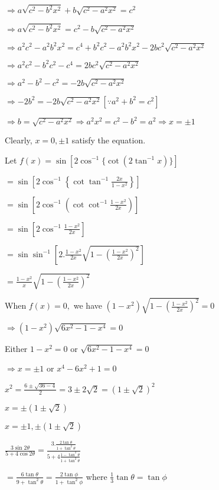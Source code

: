   $\Rightarrow a\sqrt{c^2 - b^2x^2} + b\sqrt{c^2 - a^2x^2} = c^2$

  $\Rightarrow a\sqrt{c^2 - b^2x^2} = c^2 - b\sqrt{c^2 - a^2x^2}$

  $\Rightarrow a^2c^2 - a^2b^2x^2 = c^4 + b^2c^2 - a^2b^2x^2 - 2bc^2\sqrt{c^2 - a^2x^2}$

  $\Rightarrow a^2c^2 - b^2c^2 - c^4 = 2bc^2\sqrt{c^2 - a^2x^2}$

  $\Rightarrow a^2 - b^2 - c^2 = -2b\sqrt{c^2 - a^2x^2}$

  $\Rightarrow -2b^2 = -2b\sqrt{c^2 - a^2x^2}[\because a^2 + b^2 = c^2]$

  $\Rightarrow b = \sqrt{c^2 - a^2x^2} \Rightarrow a^2x^2 = c^2 - b^2 = a^2 \Rightarrow x = \pm 1$

  Clearly, $x = 0, \pm 1$ satisfy the equation.

\item Let $f(x) = \sin[2\cos^{-1}\{\cot(2\tan^{-1}x)\}]$

  $= \sin\left[2\cos^{-1}\left\{\cot \tan^{-1}\frac{2x}{1 - x^2}\right\}\right]$

  $= \sin\left[2\cos^{-1}\left(\cot\cot^{-1}\frac{1 - x^2}{2x}\right)\right]$

  $= \sin\left[2\cos^{-1}\frac{1 - x^2}{2x}\right]$

  $= \sin\sin^{-1}\left[2.\frac{1 - x^2}{2x}\sqrt{1- \left(\frac{1 - x^2}{2x}\right)^2}\right]$

  $= \frac{1 - x^2}{x}\sqrt{1 - \left(\frac{1 - x^2}{2x}\right)^2}$

  When $f(x) = 0,$ we have $(1 - x^2)\sqrt{1 - \left(\frac{1 - x^2}{2x}\right)^2} = 0$

  $\Rightarrow (1 - x^2)\sqrt{6x^2 - 1 - x^4} = 0$

  Either $1 - x^2 = 0$ or $\sqrt{6x^2 - 1 - x^4} = 0$

  $\Rightarrow x = \pm1$ or $x^4 - 6x^2 + 1 = 0$

  $x^2 = \frac{6\pm \sqrt{36 - 4}}{2} = 3 \pm 2\sqrt{2} = (1 \pm \sqrt{2})^2$

  $x = \pm(1 \pm \sqrt{2})$

  $x = \pm 1, \pm(1 \pm \sqrt{2})$

\item $\frac{3\sin2\theta}{5 + 4\cos2\theta} = \frac{3.\frac{2\tan\theta}{1 + \tan^2\theta}}{5 + 4\frac{1 - \tan^2\theta}{1 +
    \tan^2\theta}}$

  $= \frac{6\tan\theta}{9 + \tan^2\theta} = \frac{2\tan\phi}{1 + \tan^2\phi}$ where $\frac{1}{3}\tan\theta =
  \tan\phi$

